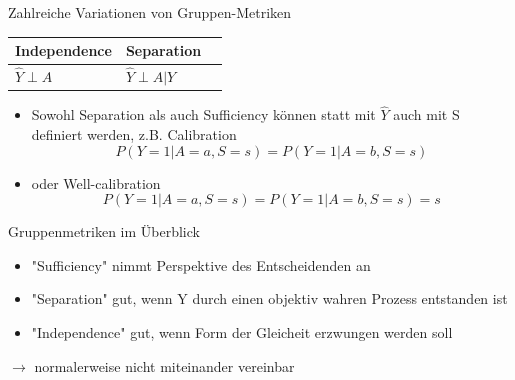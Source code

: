 \documentclass[aspectratio=169]{beamer}
\begin{document}
\begin{frame}[t]{Zahlreiche Variationen von Gruppen-Metriken}
	\vspace*{0.3cm} %
	\begin{table}
		\begin{tabular}{lll}
			\toprule
			Independence & Separation & \color{orange}{Sufficiency} \\
			\midrule
			$\hat{Y} \perp A$ & $\hat{Y} \perp A | Y$ & \color{orange}{$Y \perp A | \hat{Y}$}\\
			\bottomrule
		\end{tabular}
	\end{table}
	\begin{itemize}
		\item Sowohl Separation als auch Sufficiency können statt mit $\hat{Y}$ auch mit S definiert werden, z.B. Calibration 	$$P(Y = 1 | A = a, S = s) = P(Y = 1 | A = b, S = s)$$
		\item oder Well-calibration $$P(Y = 1 | A = a, S = s) = P(Y = 1 | A = b, S = s) = s$$
	\end{itemize}

\end{frame}

\begin{frame}{Gruppenmetriken im Überblick}
	\begin{itemize}
		\item "Sufficiency" nimmt Perspektive des Entscheidenden an
		\item "Separation" gut, wenn Y durch einen objektiv wahren Prozess entstanden ist
		\item "Independence" gut, wenn Form der Gleicheit erzwungen werden soll \cite{castelnovo2022}
	\end{itemize}
	\vspace*{0.5cm}
	\centering
	$\rightarrow$ normalerweise nicht miteinander vereinbar
\end{frame}
\end{document}
